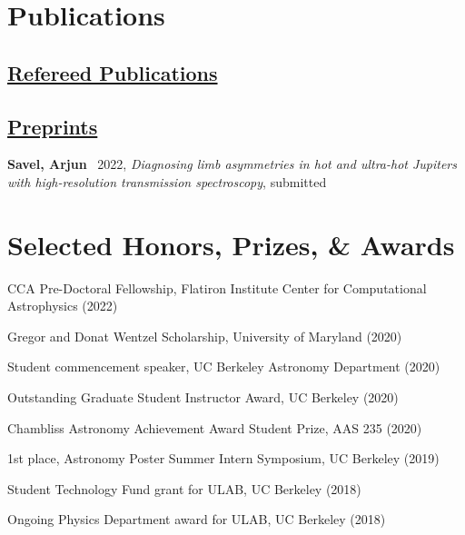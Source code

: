 \documentclass[letterpaper,12pt]{article}
\newcommand{\resumeSubHeadingListStart}{\begin{itemize}[leftmargin=*]}
\newcommand{\resumeSubHeadingListEnd}{\end{itemize}}
\newcommand{\resumeItemListEnd}{\end{itemize}\vspace{-5pt}}
\newcommand{\shorterSection}[1]{\vspace{-10pt}\section{#1}}
\newcommand{\shortershorterSection}[1]{\vspace{-10pt}\subsection{#1}}
\begin{document}


\shorterSection{Publications}

\shortershorterSection{\underline{Refereed Publications}}
\small
\begin{list}{}{\cvlist}
    
  \end{list}

\shortershorterSection{\underline{Preprints}}
\small
\begin{list}{}{\cvlist}
\item[{\color{numcolor}\scriptsize{4}}]\textbf{Savel, Arjun} \etal\, 2022, \emph{Diagnosing limb asymmetries in hot and ultra-hot Jupiters with high-resolution transmission spectroscopy}, submitted

\end{list}

\shorterSection{Selected Honors, Prizes, \& Awards}

\small
  \begin{list}{}{\cvlist}

\item[{\color{numcolor}\scriptsize8}] CCA Pre-Doctoral Fellowship, Flatiron Institute Center for Computational Astrophysics (2022)
\item[{\color{numcolor}\scriptsize7}] Gregor and Donat Wentzel Scholarship, University of Maryland (2020)

\item[{\color{numcolor}\scriptsize6}] Student commencement speaker, UC Berkeley Astronomy Department (2020)

\item[{\color{numcolor}\scriptsize5}] Outstanding Graduate Student Instructor Award, UC Berkeley (2020)

\item[{\color{numcolor}\scriptsize4}] Chambliss Astronomy Achievement Award Student Prize, AAS 235 (2020)

\item[{\color{numcolor}\scriptsize3}] 1st place, Astronomy Poster Summer Intern Symposium, UC Berkeley (2019)

\item[{\color{numcolor}\scriptsize2}] Student Technology Fund grant for ULAB, UC Berkeley (2018)

\item[{\color{numcolor}\scriptsize1}] Ongoing Physics Department award for ULAB, UC Berkeley (2018)

\end{list}
\end{document}
